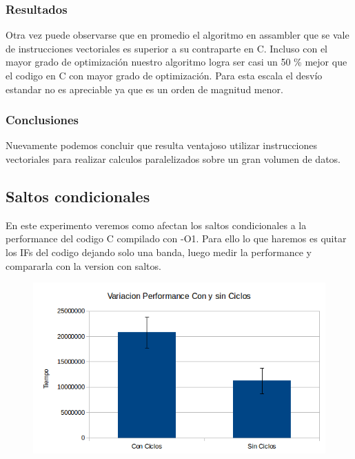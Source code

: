 \documentclass[a4paper]{article}
\begin{document}
\subsubsection{Resultados}
Otra vez puede observarse que en promedio el algoritmo en assambler que se vale de instrucciones vectoriales es superior a su contraparte en C. Incluso con el mayor grado de optimización nuestro algoritmo logra ser casi un 50 \% mejor que el codigo en C con mayor grado de optimización. Para esta escala el desvío estandar no es apreciable ya que es un orden de magnitud menor.

\subsubsection{Conclusiones}

Nuevamente podemos concluir que resulta ventajoso utilizar instrucciones vectoriales para realizar calculos paralelizados sobre un gran volumen de datos.

\newpage
\subsection{Saltos condicionales}

En este experimento veremos como afectan los saltos condicionales a la performance del codigo C compilado con -O1. Para ello lo que haremos es quitar los IFs del codigo dejando solo una banda, luego medir la performance y compararla con la version con saltos.

\begin{figure}[h!]
  \begin{center}
  \includegraphics[scale=0.66]{Graficos3.1/per.png}
  \label{nombreparareferenciar1}
  \end{center}
\end{figure}
\end{document}

